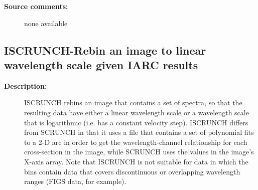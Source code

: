 \begin{description}
\begin{description}
\item [\textbf{Source comments:}]
\begin{terminalv}
  none available

\end{terminalv}
\end{description}
\subsection{ISCRUNCH-\label{ISCRUNCH}Rebin an image to linear wavelength scale given IARC results}
\begin{description}

\item [\textbf{Description:}]
 ISCRUNCH rebins an image that contains a set of spectra, so that
 the resulting data have either a linear wavelength scale or a
 wavelength scale that is logarithmic (i.e. has a constant velocity
 step).  ISCRUNCH differs from SCRUNCH in that it uses a file that
 contains a set of polynomial fits to a 2-D arc in order to get the
 wavelength-channel relationship for each cross-section in the
 image, while SCRUNCH uses the values in the image's X-axis array.
 Note that ISCRUNCH is not suitable for data in which the bins
 contain data that covers discontinuous or overlapping wavelength
 ranges (FIGS data, for example).


\end{description}
\end{description}

